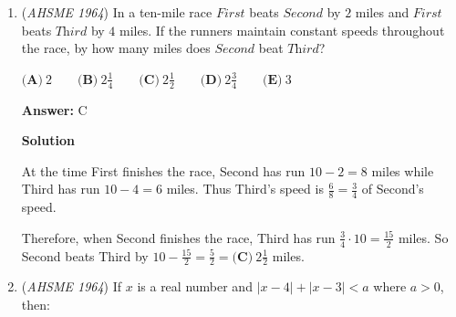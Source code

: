 \begin{enumerate}
 We now have $(x + C)(x + Ey + F)$.  Matching the $xy$ term gives $E =3$.  We now have $(x+C)(x + 3y + F)$.  Matching the $y$ term gives $3C = 12$, which leads to $C = 4$.  Finally, matching constants leads to $4F = -12$ and $F = -3$ for a provisional factorization of $(x + 4)(x + 3y - 3)$.  We've matched every coefficient except for $x$, and finding the $x$ term by selectively multiplying leads to $4x + -3x = x$, which matches, so this is a real factorization.

 We now must check $m=-12$.  The expression is $x^2+3xy+x-12y+12m$, and the skeleton once again is $(Ax + By + C)(Dx + Ey + F)$.  The beginning three steps matching $y^2, x^2, xy$ are the same, leading to $(x + C)(x + 3y + F)$.  Matching the $y$ term gives $3C = -12$, or $C = -4$.  The skeleton becomes $(x -4)(x + 3y + F)$.  The constant locks in $F = -3$ for a provisional factorization of $(x-4)(x + 3y - 3)$.  However, the $x$ term does not match up, because it is $-4x + -3x = -7x$, when it needs to be $x$.

 Thus, $m=0, 12$ work and $m=-12$ does not, giving answer $\boxed{\textbf{(B)}}$.

 


	\item (\textit{AHSME 1964}) In a ten-mile race $\textit{First}$ beats $\textit{Second}$ by $2$ miles and 
$\textit{First}$ beats $\textit{Third}$ by $4$ miles. 
If the runners maintain constant speeds throughout the race, 
by how many miles does $\textit{Second}$ beat $\textit{Third}$?


 $\textbf{(A)}\ 2\qquad \textbf{(B)}\ 2\frac{1}{4}\qquad \textbf{(C)}\ 2\frac{1}{2}\qquad \textbf{(D)}\ 2\frac{3}{4}\qquad \textbf{(E)}\ 3$

 \textbf{Answer: }C



\textbf{Solution}

At the time First finishes the race, Second has run $10-2=8$ miles while Third has run $10-4=6$ miles.  Thus Third's speed is $\frac{6}{8} = \frac{3}{4}$ of Second's speed.

 Therefore, when Second finishes the race, Third has run $\frac{3}{4}\cdot 10 = \frac{15}{2}$ miles.  So Second beats Third by $10 - \frac{15}{2} = \frac{5}{2} = \boxed{\textbf{(C)}\ 2\frac{1}{2}}$ miles.

 


	\item (\textit{AHSME 1964}) If $x$ is a real number and $|x-4|+|x-3|<a$ where $a>0$, then:



\end{enumerate}
